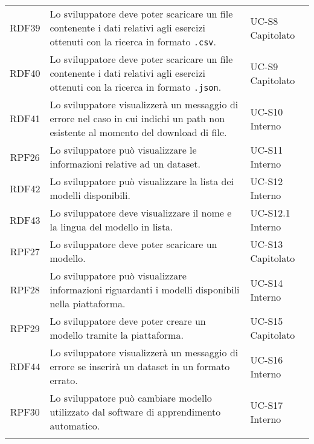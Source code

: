 \begin{tabularx}{\textwidth}{| c | p{10cm} | X |}
		RDF39 & Lo sviluppatore deve poter scaricare un file contenente i dati relativi agli esercizi ottenuti con la ricerca in formato \texttt{.csv}. & UC-S8 \newline Capitolato\\
		RDF40 & Lo sviluppatore deve poter scaricare un file contenente i dati relativi agli esercizi ottenuti con la ricerca in formato \texttt{.json}. & UC-S9 \newline Capitolato\\
		RDF41 & Lo sviluppatore visualizzerà un messaggio di errore nel caso in cui indichi un path non esistente al momento del download di file. & UC-S10 \newline Interno\\		
		RPF26 & Lo sviluppatore può visualizzare le informazioni relative ad un dataset. & UC-S11 \newline Interno\\
		RDF42 & Lo sviluppatore può visualizzare la lista dei modelli disponibili. & UC-S12 \newline Interno\\
		RDF43 & Lo sviluppatore deve visualizzare il nome e la lingua del modello in lista. & UC-S12.1 \newline Interno\\
		RPF27 & Lo sviluppatore deve poter scaricare un modello. & UC-S13 \newline Capitolato\\
		RPF28 & Lo sviluppatore può visualizzare informazioni riguardanti i modelli disponibili nella piattaforma. & UC-S14 \newline Interno\\
		RPF29 & Lo sviluppatore deve poter creare un modello tramite la piattaforma. & UC-S15 \newline Capitolato\\ 
		RDF44 & Lo sviluppatore visualizzerà un messaggio di errore se inserirà un dataset in un formato errato. & UC-S16 \newline Interno\\
		RPF30 & Lo sviluppatore può cambiare modello utilizzato dal software di apprendimento automatico. & UC-S17 \newline Interno\\
		
		\hline
		\caption{Tabella dei requisiti funzionali}
\end{tabularx}

